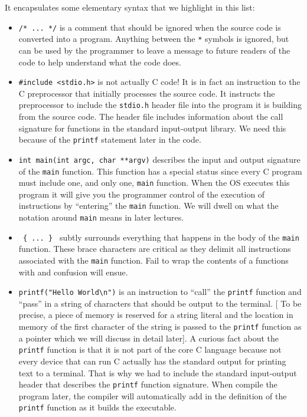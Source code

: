 \FloatBarrier

It encapsulates some elementary syntax that we highlight in this list:

\begin{itemize}
    \item {\texttt{/* ... */} is a comment that should be ignored when the source code is converted into a program. Anything between the \texttt{*} symbols is ignored, but can be used by the programmer to leave a message to future readers of the code to help understand what the code does. }
    \item \texttt{\#include <stdio.h>} is not actually C code! It is in fact an instruction to the C preprocessor that initially processes the source code. It instructs the preprocessor to include the \texttt{stdio.h} header file into the program it is building from the source code. The header file includes information about the call signature for functions in the standard input-output library. We need this because of the \texttt{printf} statement later in the code.
    \item \texttt{int main(int argc, char **argv)} describes the input and output signature of the \texttt{main} function. This function has a special status since every C program must include one, and only one, \texttt{main} function. When the OS executes this program it will give you the programmer control of the execution of instructions by ``entering'' the \texttt{main} function. We will dwell on what the notation around \texttt{main} means in later lectures.
    \item \texttt{ \{ ... \} } subtly surrounds everything that happens in the body of the \texttt{main} function. These brace characters are critical as they delimit all instructions associated with the \texttt{main} function. Fail to wrap the contents of a functions with  and confusion will ensue.
    \item \verb|printf("Hello World\n")| is an instruction to ``call'' the \texttt{printf} function and ``pass'' in a string of characters that should be output to the terminal. [ To be precise, a piece of memory is reserved for a string literal and the location in memory of the first character of the string is passed to the \texttt{printf} function as a pointer which we will discuss in detail later]. A curious fact about the \texttt{printf} function is that it is not part of the core C language because not every device that can run C actually has the standard output for printing text to a terminal. That is why we had to include the standard input-output header that describes the \texttt{printf} function signature. When compile the program later, the compiler will automatically add in the definition of the \texttt{printf} function as it builds the executable.

\end{itemize}
